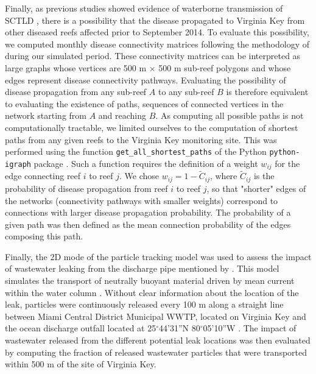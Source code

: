 Finally, as previous studies showed evidence of waterborne transmission of SCTLD \citep{aeby2019pathogenesis, dobbelaere2020coupled,eaton2021measuring, meiling2021variable}, there is a possibility that the disease propagated to Virginia Key from other diseased reefs affected prior to September 2014. To evaluate this possibility, we computed monthly disease connectivity matrices following the methodology of \cite{dobbelaere2020coupled} during our simulated period. These connectivity matrices can be interpreted as large graphs whose vertices are 500 m $\times$ 500 m sub-reef polygons and whose edges represent disease connectivity pathways. Evaluating the possibility of disease propagation from any sub-reef $A$ to any sub-reef $B$ is therefore equivalent to evaluating the existence of paths, \ie sequences of connected vertices in the network starting from $A$ and reaching $B$. As computing all possible paths is not computationally tractable, we limited ourselves to the computation of shortest paths from any given reefs to the Virginia Key monitoring site. This was performed using the function \texttt{get\_all\_shortest\_paths} of the Python \texttt{python-igraph} package \citep{csardi2006igraph}. Such a function requires the definition of a weight $w_{ij}$ for the edge connecting reef $i$ to reef $j$. We chose $w_{ij} = 1-\tilde{C}_{ij}$, where $\tilde{C}_{ij}$ is the probability of disease propagation from reef $i$ to reef $j$, so that "shorter" edges of the networks (\ie connectivity pathways with smaller weights) correspond to connections with larger disease propagation probability. The probability of a given path was then defined as the mean connection probability of the edges composing this path.

Finally, the 2D mode of the particle tracking model was used to assess the impact of wastewater leaking from the discharge pipe mentioned by \cite{gintert2019regional}. This model simulates the transport of neutrally buoyant material driven by mean current within the water column \citep{dobbelaere2020coupled}. Without clear information about the location of the leak, particles were continuously released every 100 m along a straight line between Miami Central District Municipal WWTP, located on Virginia Key and the ocean discharge outfall located at 25$^\circ$44'31''N 80$^\circ$05'10''W \citep{koopman2006ocean}. The impact of wastewater released from the different potential leak locations was then evaluated by computing the fraction of released wastewater particles that were transported within 500 m of the site of Virginia Key.

